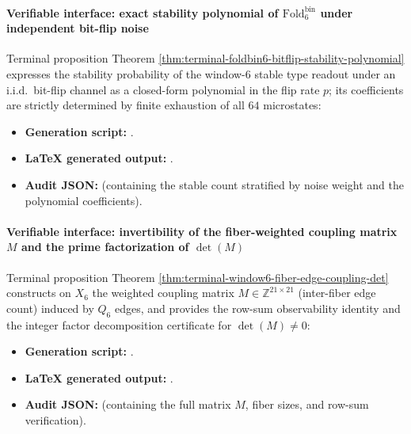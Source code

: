 \paragraph{Verifiable interface: exact stability polynomial of \texorpdfstring{$\mathrm{Fold}^{\mathrm{bin}}_6$}{Foldbin6} under independent bit-flip noise}
Terminal proposition Theorem \ref{thm:terminal-foldbin6-bitflip-stability-polynomial} expresses the stability probability of the window-\(6\) stable type readout under an i.i.d.\ bit-flip channel as a closed-form polynomial in the flip rate \(p\); its coefficients are strictly determined by finite exhaustion of all \(64\) microstates:
\begin{itemize}
  \item \textbf{Generation script:} \texttt{}.
  \item \textbf{LaTeX generated output:} \texttt{}.
  \item \textbf{Audit JSON:} \texttt{} (containing the stable count stratified by noise weight and the polynomial coefficients).
\end{itemize}

\paragraph{Verifiable interface: invertibility of the fiber-weighted coupling matrix \(M\) and the prime factorization of \texorpdfstring{$\det(M)$}{det(M)}}
Terminal proposition Theorem \ref{thm:terminal-window6-fiber-edge-coupling-det} constructs on \(X_6\) the weighted coupling matrix \(M\in\mathbb{Z}^{21\times 21}\) (inter-fiber edge count) induced by \(Q_6\) edges, and provides the row-sum observability identity and the integer factor decomposition certificate for \(\det(M)\neq 0\):
\begin{itemize}
  \item \textbf{Generation script:} \texttt{}.
  \item \textbf{LaTeX generated output:} \texttt{}.
  \item \textbf{Audit JSON:} \texttt{} (containing the full matrix \(M\), fiber sizes, and row-sum verification).
\end{itemize}

